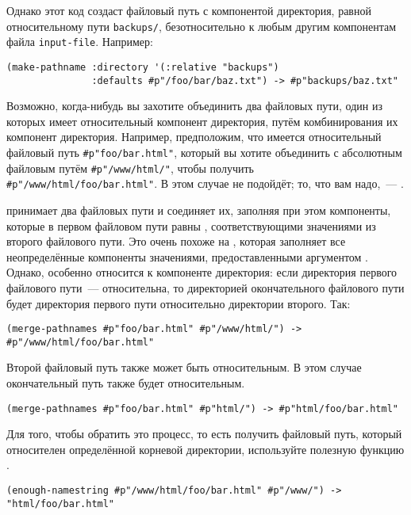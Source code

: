 Однако этот код создаст файловый путь с компонентой директория, равной относительному пути
\lstinline!backups/!, безотносительно к любым другим компонентам файла \lstinline!input-file!.
Например:

\begin{lstlisting}
(make-pathname :directory '(:relative "backups") 
               :defaults #p"/foo/bar/baz.txt") -> #p"backups/baz.txt" 
\end{lstlisting}

Возможно, когда-нибудь вы захотите объединить два файловых пути, один из которых имеет
относительный компонент директория, путём комбинирования их компонент
директория. Например, предположим, что имеется относительный файловый путь
\lstinline!#p"foo/bar.html"!, который вы хотите объединить с абсолютным файловым путём
\lstinline!#p"/www/html/"!, чтобы получить \lstinline!#p"/www/html/foo/bar.html"!. В этом
случае  не подойдёт; то, что вам надо,~--- .

 принимает два файловых пути и соединяет их, заполняя при этом
компоненты, которые в первом файловом пути равны , соответствующими значениями
из второго файлового пути. Это очень похоже на , которая заполняет все
неопределённые компоненты значениями, предоставленными аргументом
. Однако,  особенно относится к компоненте
директория: если директория первого файлового пути~--- относительна, то директорией
окончательного файлового пути будет директория первого пути относительно директории
второго. Так:

\begin{lstlisting}
(merge-pathnames #p"foo/bar.html" #p"/www/html/") -> #p"/www/html/foo/bar.html" 
\end{lstlisting}

Второй файловый путь также может быть относительным. В этом случае окончательный путь
также будет относительным.

\begin{lstlisting}
(merge-pathnames #p"foo/bar.html" #p"html/") -> #p"html/foo/bar.html" 
\end{lstlisting}

Для того, чтобы обратить это процесс, то есть получить файловый путь, который относителен
определённой корневой директории, используйте полезную функцию .

\begin{lstlisting}
(enough-namestring #p"/www/html/foo/bar.html" #p"/www/") -> "html/foo/bar.html" 
\end{lstlisting}

